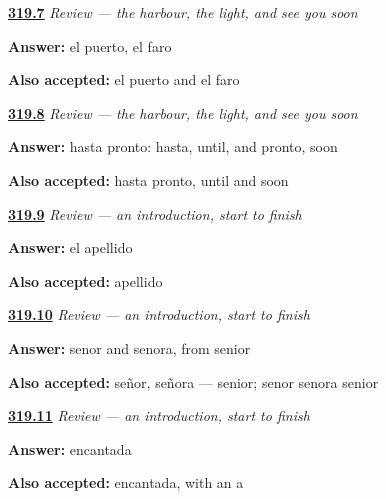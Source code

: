 \noindent\begin{minipage}[t]{\linewidth}
\raggedright
\hyperlink{review-ES-C319-despedida-harbour}{\textbf{319.7}} \emph{Review — the harbour, the light, and see you soon}\par
\small \textbf{Answer:} el puerto, el faro\par
\footnotesize \textbf{Also accepted:} el puerto and el faro
\end{minipage}\par\medskip

\noindent\begin{minipage}[t]{\linewidth}
\raggedright
\hyperlink{review-ES-C319-despedida-soon}{\textbf{319.8}} \emph{Review — the harbour, the light, and see you soon}\par
\small \textbf{Answer:} hasta pronto: hasta, until, and pronto, soon\par
\footnotesize \textbf{Also accepted:} hasta pronto, until and soon
\end{minipage}\par\medskip

\noindent\begin{minipage}[t]{\linewidth}
\raggedright
\hyperlink{review-ES-C319-repaso-presentarse-surname}{\textbf{319.9}} \emph{Review — an introduction, start to finish}\par
\small \textbf{Answer:} el apellido\par
\footnotesize \textbf{Also accepted:} apellido
\end{minipage}\par\medskip

\noindent\begin{minipage}[t]{\linewidth}
\raggedright
\hyperlink{review-ES-C319-repaso-presentarse-address}{\textbf{319.10}} \emph{Review — an introduction, start to finish}\par
\small \textbf{Answer:} senor and senora, from senior\par
\footnotesize \textbf{Also accepted:} señor, señora — senior; senor senora senior
\end{minipage}\par\medskip

\noindent\begin{minipage}[t]{\linewidth}
\raggedright
\hyperlink{review-ES-C319-repaso-presentarse-reply}{\textbf{319.11}} \emph{Review — an introduction, start to finish}\par
\small \textbf{Answer:} encantada\par
\footnotesize \textbf{Also accepted:} encantada, with an a
\end{minipage}\par\medskip

